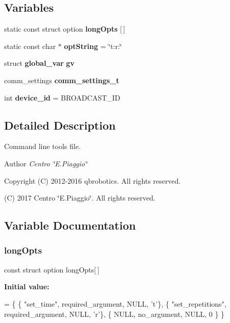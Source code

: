 \subsection*{Variables}
\begin{DoxyCompactItemize}
\item 
static const struct option {\bfseries long\+Opts} [$\,$]
\item 
\mbox{\label{qbmove__test_8c_a1b7271ddd60c22960c39ae6caf4d5254}} 
static const char $\ast$ {\bfseries opt\+String} = \char`\"{}t\+:r\+:\char`\"{}
\item 
\mbox{\label{qbmove__test_8c_a44064839969a9a8667c29d9f06dfd8c6}} 
struct \textbf{ global\+\_\+var} {\bfseries gv}
\item 
\mbox{\label{qbmove__test_8c_a92153f4b70cd8ba4e9b502ccff8d28bf}} 
comm\+\_\+settings {\bfseries comm\+\_\+settings\+\_\+t}
\item 
\mbox{\label{qbmove__test_8c_accfd0301c469314772cc651ec198d492}} 
int {\bfseries device\+\_\+id} = B\+R\+O\+A\+D\+C\+A\+S\+T\+\_\+\+ID
\end{DoxyCompactItemize}


\subsection{Detailed Description}
Command line tools file. 

\begin{DoxyAuthor}{Author}
{\itshape Centro \char`\"{}\+E.\+Piaggio\char`\"{}} 
\end{DoxyAuthor}
\begin{DoxyCopyright}{Copyright}
(C) 2012-\/2016 qbrobotics. All rights reserved. 

(C) 2017 Centro \char`\"{}\+E.\+Piaggio\char`\"{}. All rights reserved. 
\end{DoxyCopyright}


\subsection{Variable Documentation}
\mbox{\label{qbmove__test_8c_a091f2d9683d6ef802780b360f66bad67}} 
\subsubsection{long\+Opts}
{\footnotesize\ttfamily const struct option long\+Opts[$\,$]\hspace{0.3cm}{\ttfamily [static]}}

{\bfseries Initial value\+:}
\begin{DoxyCode}
= \{
    \{ \textcolor{stringliteral}{"set\_time"}, required\_argument, NULL, \textcolor{charliteral}{'t'}\},
    \{ \textcolor{stringliteral}{"set\_repetitions"}, required\_argument, NULL, \textcolor{charliteral}{'r'}\},
    \{ NULL, no\_argument, NULL, 0 \}
\}
\end{DoxyCode}
